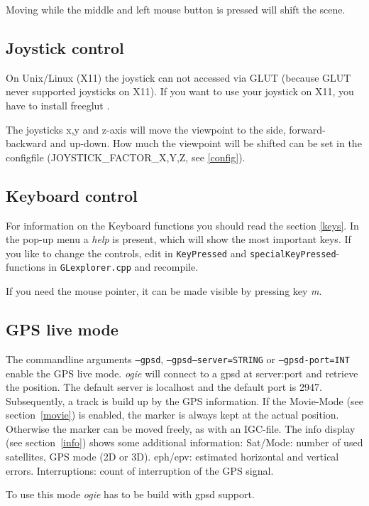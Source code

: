 Moving while the middle and left mouse button is pressed will shift the scene.


\subsection{Joystick control}
On Unix/Linux (X11) the joystick can not accessed via GLUT (because
GLUT never supported joysticks on X11). If you want to use your joystick on X11, you have to install freeglut \cite{freeglut}.

The joysticks x,y and z-axis will move the viewpoint to the side, forward-backward and up-down. How much the viewpoint
will be shifted can be set in the configfile (JOYSTICK\_FACTOR\_X,Y,Z, see \ref{config}).

\subsection{Keyboard control}
For information on the Keyboard functions you should read the section \ref{keys}.
In the pop-up menu a \emph{help} is present, which will show the most important keys.
If you like to change the controls, edit in \texttt{KeyPressed} and \texttt{specialKeyPressed}-functions in
\texttt{GLexplorer.cpp} and recompile.

If you need the mouse pointer, it can be made visible by pressing key \emph{m}.


\subsection{GPS live mode}
\label{gps}

The commandline arguments \texttt{--gpsd}, \texttt{--gpsd--server=STRING} or \texttt{--gpsd-port=INT} enable the GPS live mode.
\emph{ogie} will connect to a gpsd at server:port and retrieve the position.
The default server is localhost and the default port is 2947.
Subsequently, a track is build up by the GPS information.
If the Movie-Mode (see section~\ref{movie}) is enabled, the marker is always kept at the actual position.
Otherwise the marker can be moved freely, as with an IGC-file.
The info display (see section~\ref{info}) shows some additional information:
Sat/Mode: number of used satellites, GPS mode (2D or 3D). eph/epv: estimated horizontal and vertical errors. Interruptions: count of interruption of the GPS signal.

To use this mode \emph{ogie} has to be build with gpsd support.

